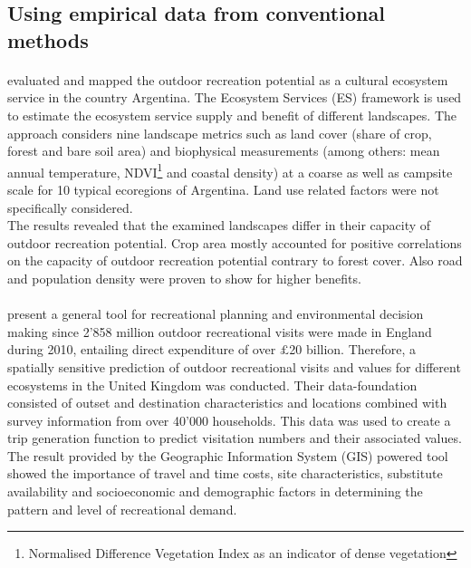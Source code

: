 \subsection{Using empirical data from conventional methods}

\paragraph*{\textcite{Weyland2014}} evaluated and mapped the outdoor recreation potential as a cultural ecosystem service in the country Argentina. The Ecosystem Services (ES) framework is used to estimate the ecosystem service supply and benefit of different landscapes. The approach considers nine landscape metrics such as land cover (share of crop, forest and bare soil area) and biophysical measurements (among others: mean annual temperature, NDVI\footnote{Normalised Difference Vegetation Index as an indicator of dense vegetation} and coastal density) at a coarse as well as campsite scale for 10 typical ecoregions of Argentina. Land use related factors were not specifically considered. \\
The results revealed that the examined landscapes differ in their capacity of outdoor recreation potential. Crop area mostly accounted for positive correlations on the capacity of outdoor recreation potential contrary to forest cover. Also road and population density were proven to show for higher benefits.

\paragraph*{\textcite{Sen2014}} present a general tool for recreational planning and environmental decision making since 2'858 million outdoor recreational visits were made in England during 2010, entailing direct expenditure of over $£$20 billion. Therefore, a spatially sensitive prediction of outdoor recreational visits and values for different ecosystems in the United Kingdom was conducted. Their data-foundation consisted of outset and destination characteristics and locations combined with survey information from over 40'000 households. This data was used to create a trip generation function to predict visitation numbers and their associated values.\\
The result provided by the Geographic Information System (GIS) powered tool showed the importance of travel and time costs, site characteristics, substitute availability and socioeconomic and demographic factors in determining the pattern and level of recreational demand.

